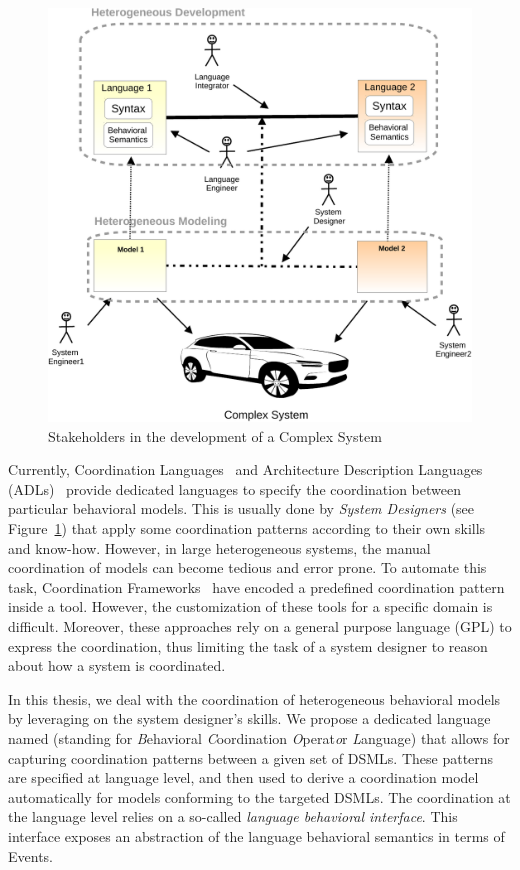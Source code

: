 \begin{figure}
	\begin{center}
		\includegraphics[width=1\textwidth]{introduction/stakeholders}
		\caption{Stakeholders in the development of a Complex System}
		\label{fig:stackeholders}
	\end{center}
\end{figure}
	
Currently, Coordination Languages~\cite{coordsignibib} and Architecture Description Languages (ADLs)~\cite{frameadlsbib} provide dedicated languages to specify the coordination between particular behavioral models. This is usually done by \emph{System Designers} (see Figure~\ref{fig:stackeholders}) that apply some coordination patterns according to their own skills and know-how. However, in large heterogeneous systems, the manual coordination of models can become tedious and error prone. To automate this task, Coordination Frameworks~\cite{ptoleframebib,modhelxbib} have encoded a predefined coordination pattern inside a tool. However, the customization of these tools for a specific domain is difficult. Moreover, these approaches rely on a general purpose language (GPL) to express the coordination, thus limiting the task of a system designer to reason about how a system is coordinated.  
	
In this thesis, we deal with the coordination of heterogeneous behavioral models by leveraging on the system designer's skills. We propose a dedicated language named \bcool (standing for \emph{B}ehavioral \emph{C}oordination \emph{O}perat\emph{o}r \emph{L}anguage) that allows for capturing coordination patterns between a given set of DSMLs. These patterns are specified at language level, and then used to derive a coordination model automatically for models conforming to the targeted DSMLs. The coordination at the language level relies on a so-called \emph{language behavioral interface}. This interface exposes an abstraction of the language behavioral semantics in terms of Events.


